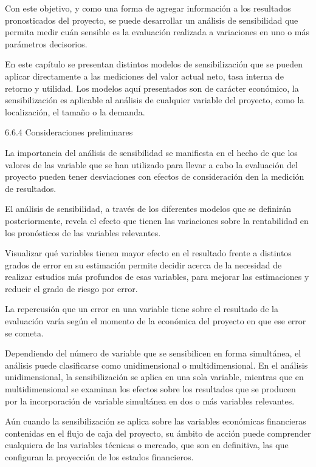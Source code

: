 Con este objetivo, y como una forma de agregar información a los resultados pronosticados del proyecto, se puede desarrollar un análisis de sensibilidad que permita medir cuán sensible es la evaluación realizada a variaciones en uno o más parámetros decisorios.

En este capítulo se presentan distintos modelos de sensibilización que se pueden aplicar directamente a las mediciones del valor actual neto, tasa interna de retorno y utilidad. Los modelos aquí presentados son de carácter económico, la sensibilización es aplicable al análisis de cualquier variable del proyecto, como la localización, el tamaño o la demanda.

6.6.4   Consideraciones preliminares

La importancia del análisis de sensibilidad se manifiesta en el hecho de que los valores de las variable que se han utilizado para llevar a cabo la evaluación del proyecto pueden tener desviaciones con efectos de consideración den la medición de resultados.

El análisis de sensibilidad, a través de los diferentes modelos que se definirán posteriormente, revela el efecto que tienen las variaciones sobre la rentabilidad en los pronósticos de las variables relevantes.

Visualizar qué variables tienen mayor efecto en el resultado frente a distintos grados de error en su estimación permite decidir acerca de la necesidad de realizar estudios más profundos de esas variables, para mejorar las estimaciones y reducir el grado de riesgo por error.

La repercusión que un error en una variable tiene sobre el resultado de la evaluación varía según el momento de la económica del proyecto en que ese error se cometa.

Dependiendo del número de variable que se sensibilicen en forma simultánea, el análisis puede clasificarse como unidimensional o multidimensional. En el análisis unidimensional, la sensibilización se aplica en una sola variable, mientras que en multidimensional se examinan los efectos sobre los resultados que se producen por la incorporación de variable simultánea en dos o más variables relevantes.

Aún cuando la sensibilización se aplica sobre las variables económicas financieras contenidas en el flujo de caja del proyecto, su ámbito de acción puede comprender cualquiera de las variables técnicas o mercado, que son en definitiva, las que configuran la proyección de los estados financieros.

